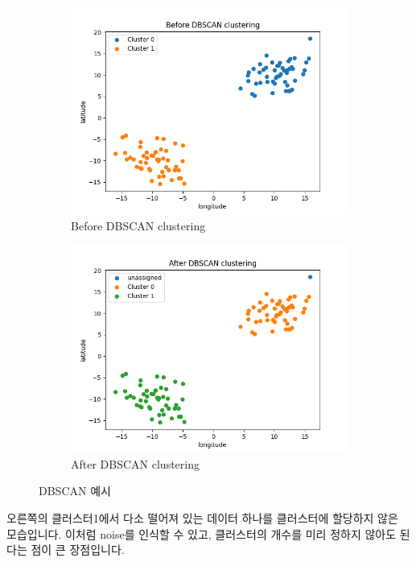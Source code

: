 \documentclass{oblivoir}
\begin{document}
  \begin{figure}[H]
    \begin{subfigure}[b]{.5\textwidth}
      \centering
      \caption{Before DBSCAN clustering}
      \includegraphics[width=\textwidth]{GPS_clustering_4.png}
    \end{subfigure}%
    \begin{subfigure}[b]{.5\textwidth}
      \centering
      \caption{After DBSCAN clustering}
      \includegraphics[width=\textwidth]{GPS_clustering_5.png}      
    \end{subfigure}
    \caption{DBSCAN 예시}
  \end{figure}
  오른쪽의 클러스터1에서 다소 떨어져 있는 데이터 하나를 클러스터에 할당하지 않은 모습입니다.
  이처럼 noise를 인식할 수 있고, 클러스터의 개수를 미리 정하지 않아도 된다는 점이 큰 장점입니다.
\end{document}
